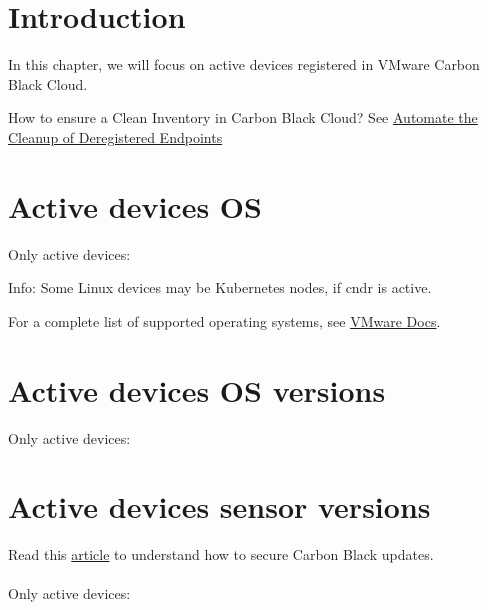 \section{Introduction}

In this chapter, we will focus on \gls{active} devices registered in VMware Carbon Black Cloud.\\

\begin{tipblock}
How to ensure a Clean Inventory in Carbon Black Cloud? See 
\href{https://carbonblack.vmware.com/blog/automate-cleanup-deregistered-endpoints}{Automate the Cleanup of Deregistered Endpoints}
\end{tipblock}

\section{Active devices OS}

Only \gls{active} devices:



 \begin{noteblock}
Info: Some Linux devices may be Kubernetes nodes, if \gls{cndr} is active.
\end{noteblock} 

For a complete list of supported operating systems, see \href{https://docs.vmware.com/en/VMware-Carbon-Black-Cloud/services/cbc-endpoint-standard-oer/GUID-45BFDC75-748B-4E05-8B38-190B59204D0B.html}{VMware Docs}.\\


\section{Active devices OS versions}

Only \gls{active} devices:



\section{Active devices sensor versions}

Read this \href{https://carbonblack.vmware.com/resource/secure-carbon-black-cloud-updates}{article} to understand how to secure Carbon Black updates.\\
\\
Only \gls{active} devices:

